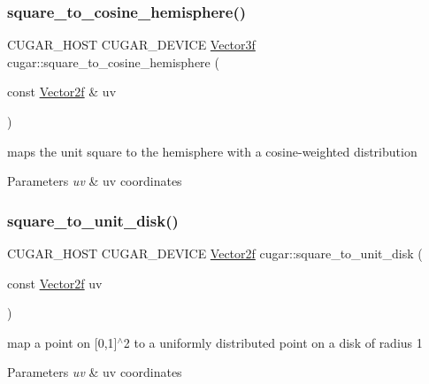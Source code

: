 \subsubsection{\texorpdfstring{square\+\_\+to\+\_\+cosine\+\_\+hemisphere()}{square\_to\_cosine\_hemisphere()}}
{\footnotesize\ttfamily C\+U\+G\+A\+R\+\_\+\+H\+O\+ST C\+U\+G\+A\+R\+\_\+\+D\+E\+V\+I\+CE \hyperlink{structcugar_1_1_vector}{Vector3f} cugar\+::square\+\_\+to\+\_\+cosine\+\_\+hemisphere (\begin{DoxyParamCaption}\item[{const \hyperlink{structcugar_1_1_vector}{Vector2f} \&}]{uv }\end{DoxyParamCaption})\hspace{0.3cm}{\ttfamily [inline]}}

maps the unit square to the hemisphere with a cosine-\/weighted distribution


\begin{DoxyParams}{Parameters}
{\em uv} & uv coordinates \\
\hline
\end{DoxyParams}
\mbox{\label{group__spherical__mappings_ga1c891ec8d6e220337a3e39e6dc286e9b}} 
\subsubsection{\texorpdfstring{square\+\_\+to\+\_\+unit\+\_\+disk()}{square\_to\_unit\_disk()}}
{\footnotesize\ttfamily C\+U\+G\+A\+R\+\_\+\+H\+O\+ST C\+U\+G\+A\+R\+\_\+\+D\+E\+V\+I\+CE \hyperlink{structcugar_1_1_vector}{Vector2f} cugar\+::square\+\_\+to\+\_\+unit\+\_\+disk (\begin{DoxyParamCaption}\item[{const \hyperlink{structcugar_1_1_vector}{Vector2f}}]{uv }\end{DoxyParamCaption})\hspace{0.3cm}{\ttfamily [inline]}}

map a point on \mbox{[}0,1\mbox{]}$^\wedge$2 to a uniformly distributed point on a disk of radius 1


\begin{DoxyParams}{Parameters}
{\em uv} & uv coordinates \\
\hline
\end{DoxyParams}
\mbox{\label{group__spherical__mappings_ga180b90ffc2cc3cfcfe63e911ea51a1ab}} 
